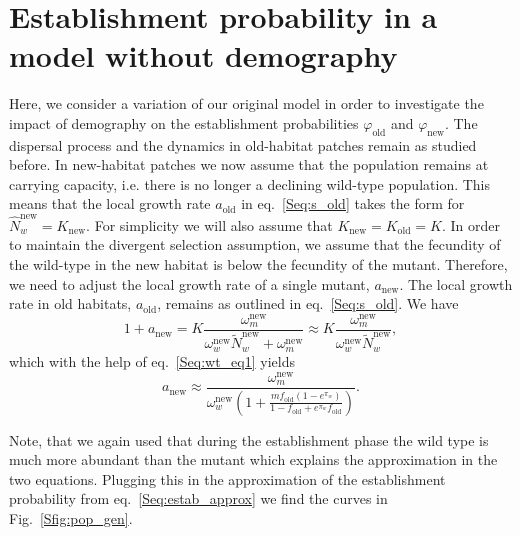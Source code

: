 \documentclass[11pt]{article}
\newcommand{\chg}[1]{\textcolor{change}{#1}}
\begin{document}
\newpage
\renewcommand{\theequation}{E\arabic{equation}}
\setcounter{equation}{0}  %

\section{Establishment probability in a model without demography}
Here, we consider a variation of our original model in order to investigate the impact of demography on the establishment probabilities $\varphi_{\text{old}}$ and $\varphi_{\text{new}}$. The dispersal process and the dynamics in old-habitat patches remain as studied before. In new-habitat patches we now assume that the population remains at carrying capacity, i.e. there is no longer a declining wild-type population. This means that the local growth rate $a_{\text{old}}$ in eq.~\eqref{Seq:s_old} takes the form for $\widehat{N}_w^{\text{new}}=K_{\text{new}}$. For simplicity we will also assume that $K_{\text{new}}=K_{\text{old}}=K$. In order to maintain the divergent selection assumption, we assume that the fecundity of the wild-type in the new habitat is below the fecundity of the mutant. %
Therefore, we need to adjust the local growth rate of a single mutant, $a_{\text{new}}$. The local growth rate in old habitats, $a_{\text{old}}$, remains as outlined in eq.~\eqref{Seq:s_old}. We have
\begin{equation}
1+a_{\text{new}} = K \frac{\omega_m^{\text{new}}}{\omega_w^{\text{new}} \widetilde{N}_w^{\text{new}}+ \omega_m^{\text{new}}}\approx K \frac{\omega_m^{\text{new}}}{\omega_w^{\text{new}} \widetilde{N}_w^{\text{new}}},
\end{equation}
which with the help of eq.~\eqref{Seq:wt_eq1} yields
\begin{equation}
a_{\text{new}} \approx \frac{\omega_m^{\text{new}}}{\omega_w^{\text{new}}\left(1+\frac{m f_{\text{old}} (1- e^{\pi_w})}{1-f_{\text{old}}+ e^{\pi_w} f_{\text{old}}}\right)}.
\end{equation}

\chg{Note, that we again used that during the establishment phase the wild type is much more abundant than the mutant which explains the approximation in the two equations.}
Plugging this in the approximation of the establishment probability from eq.~\eqref{Seq:estab_approx} we find the curves in Fig.~\ref{Sfig:pop_gen}.
\end{document}
